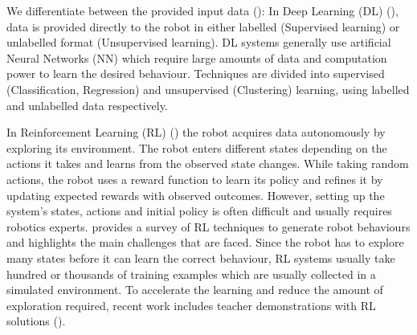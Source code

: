 We differentiate between the provided input data (): 
In Deep Learning (DL) (\cite{schmidhuber2015deep}), data is provided directly to the robot in either labelled (Supervised learning) or unlabelled format (Unsupervised learning).
DL systems generally use artificial Neural Networks (NN) which require large amounts of data and computation power to learn the desired behaviour.
Techniques are divided into supervised (\eg Classification, Regression) and unsupervised (\eg Clustering) learning, using labelled and unlabelled data respectively.

In Reinforcement Learning (RL)  (\cite{sutton1998reinforcement,kaelbling1996reinforcement,gosavi2009reinforcement}) the robot acquires data autonomously by exploring its environment.
The robot enters different states depending on the actions it takes and learns from the observed state changes.
While taking random actions, the robot uses a reward function to learn its policy and refines it by updating expected rewards with observed outcomes.
However, setting up the system's states, actions and initial policy is often difficult and usually requires robotics experts.
\cite{kober2013reinforcement} provides a survey of RL techniques to generate robot behaviours and highlights the main challenges that are faced.
Since the robot has to explore many states before it can learn the correct behaviour, RL systems usually take hundred or thousands of training examples which are usually collected in a simulated environment.
To accelerate the learning and reduce the amount of exploration required, recent work includes teacher demonstrations with RL solutions (\cite{martinez2017relational,hester2017learning}).




